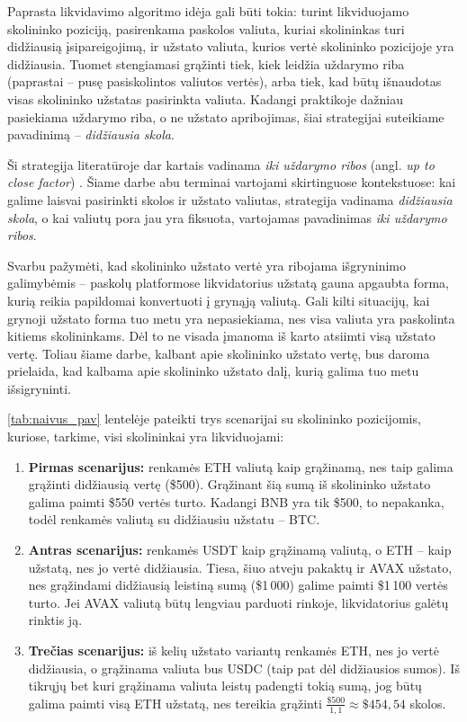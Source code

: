 \documentclass[]{VUMIFTemplateClass}
\begin{document}
Paprasta likvidavimo algoritmo idėja gali būti tokia: turint likviduojamo skolininko poziciją, pasirenkama paskolos valiuta, kuriai skolininkas turi didžiausią įsipareigojimą, ir užstato valiuta, kurios vertė skolininko pozicijoje yra didžiausia. Tuomet stengiamasi grąžinti tiek, kiek leidžia uždarymo riba (paprastai – pusę pasiskolintos valiutos vertės), arba tiek, kad būtų išnaudotas visas skolininko užstatas pasirinkta valiuta. Kadangi praktikoje dažniau pasiekiama uždarymo riba, o ne užstato apribojimas, šiai strategijai suteikiame pavadinimą – \textit{didžiausia skola}.

Ši strategija literatūroje dar kartais vadinama \textit{iki uždarymo ribos} (angl. \textit{up to close factor}) \cite{Emp}. Šiame darbe abu terminai vartojami skirtinguose kontekstuose: kai galime laisvai pasirinkti skolos ir užstato valiutas, strategija vadinama \textit{didžiausia skola}, o kai valiutų pora jau yra fiksuota, vartojamas pavadinimas \textit{iki uždarymo ribos}.

Svarbu pažymėti, kad skolininko užstato vertė yra ribojama išgryninimo galimybėmis – paskolų platformose likvidatorius užstatą gauna apgaubta forma, kurią reikia papildomai konvertuoti į grynąją valiutą. Gali kilti situacijų, kai grynoji užstato forma tuo metu yra nepasiekiama, nes visa valiuta yra paskolinta kitiems skolininkams. Dėl to ne visada įmanoma iš karto atsiimti visą užstato vertę. Toliau šiame darbe, kalbant apie skolininko užstato vertę, bus daroma prielaida, kad kalbama apie skolininko užstato dalį, kurią galima tuo metu išsigryninti.

\ref{tab:naivus_pav} lentelėje pateikti trys scenarijai su skolininko pozicijomis, kuriose, tarkime, visi skolininkai yra likviduojami:
\begin{enumerate}
    \item \textbf{Pirmas scenarijus:} renkamės ETH valiutą kaip grąžinamą, nes taip galima grąžinti didžiausią vertę (\$500). Grąžinant šią sumą iš skolininko užstato galima paimti \$550 vertės turto. Kadangi BNB yra tik \$500, to nepakanka, todėl renkamės valiutą su didžiausiu užstatu – BTC.
    
    \item \textbf{Antras scenarijus:} renkamės USDT kaip grąžinamą valiutą, o ETH – kaip užstatą, nes jo vertė didžiausia. Tiesa, šiuo atveju pakaktų ir AVAX užstato, nes grąžindami didžiausią leistiną sumą (\$1\,000) galime paimti \$1\,100 vertės turto. Jei AVAX valiutą būtų lengviau parduoti rinkoje, likvidatorius galėtų rinktis ją.

    \item \textbf{Trečias scenarijus:} iš kelių užstato variantų renkamės ETH, nes jo vertė didžiausia, o grąžinama valiuta bus USDC (taip pat dėl didžiausios sumos). Iš tikrųjų bet kuri grąžinama valiuta leistų padengti tokią sumą, jog būtų galima paimti visą ETH užstatą, nes tereikia grąžinti $\frac{\$500}{1,1} \approx \$454,54$ skolos.
\end{enumerate}
\end{document}
